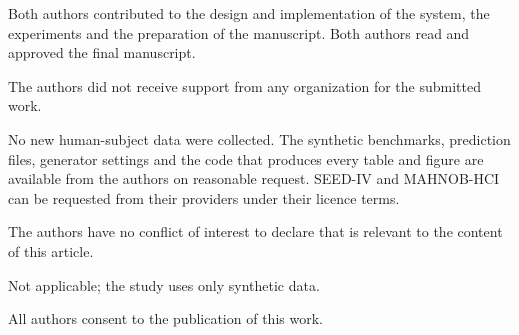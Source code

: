 \documentclass[10pt,twoside]{article}
\begin{document}
\vspace{10pt}
{\small
{}\enspace Both authors contributed to the design and implementation of the system, the experiments and the preparation of the manuscript. Both authors read and approved the final manuscript.

\vspace{4pt}
\enspace The authors did not receive support from any organization for the submitted work.

\vspace{4pt}
\enspace No new human-subject data were collected. The synthetic benchmarks, prediction files, generator settings and the code that produces every table and figure are available from the authors on reasonable request. SEED-IV and MAHNOB-HCI can be requested from their providers under their licence terms.

\vspace{8pt}

\vspace{4pt}
\enspace The authors have no conflict of interest to declare that is relevant to the content of this article.

\vspace{4pt}
\enspace Not applicable; the study uses only synthetic data.

\vspace{4pt}
\enspace All authors consent to the publication of this work.
}

\renewcommand{\refname}{\sffamily\bfseries\large References}
{\footnotesize
\setlength{\itemsep}{0pt}

}
\end{document}
